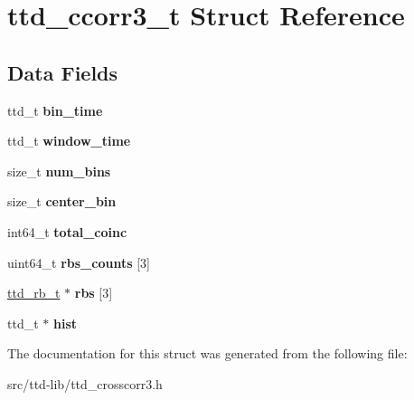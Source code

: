 \hypertarget{structttd__ccorr3__t}{}\section{ttd\+\_\+ccorr3\+\_\+t Struct Reference}
\label{structttd__ccorr3__t}
\subsection*{Data Fields}
\begin{DoxyCompactItemize}
\item 
\hypertarget{structttd__ccorr3__t_a1b78bd602c9780771a731ff59b39e214}{}ttd\+\_\+t {\bfseries bin\+\_\+time}\label{structttd__ccorr3__t_a1b78bd602c9780771a731ff59b39e214}

\item 
\hypertarget{structttd__ccorr3__t_ab3fdd8df8049f1fab663a27a9b4acfbb}{}ttd\+\_\+t {\bfseries window\+\_\+time}\label{structttd__ccorr3__t_ab3fdd8df8049f1fab663a27a9b4acfbb}

\item 
\hypertarget{structttd__ccorr3__t_a1fe4cf804dcccb4879c1834cbfd13d9c}{}size\+\_\+t {\bfseries num\+\_\+bins}\label{structttd__ccorr3__t_a1fe4cf804dcccb4879c1834cbfd13d9c}

\item 
\hypertarget{structttd__ccorr3__t_a932f1073e41399d43d4910d67677276d}{}size\+\_\+t {\bfseries center\+\_\+bin}\label{structttd__ccorr3__t_a932f1073e41399d43d4910d67677276d}

\item 
\hypertarget{structttd__ccorr3__t_a7808ee4e7455c7b5aad4f2c277cd69e3}{}int64\+\_\+t {\bfseries total\+\_\+coinc}\label{structttd__ccorr3__t_a7808ee4e7455c7b5aad4f2c277cd69e3}

\item 
\hypertarget{structttd__ccorr3__t_ae10696d3049f51f2e8bf4b6af043489e}{}uint64\+\_\+t {\bfseries rbs\+\_\+counts} \mbox{[}3\mbox{]}\label{structttd__ccorr3__t_ae10696d3049f51f2e8bf4b6af043489e}

\item 
\hypertarget{structttd__ccorr3__t_a5695c7e4aae5c5b724f2681d72c20720}{}\hyperlink{structttd__rb__t}{ttd\+\_\+rb\+\_\+t} $\ast$ {\bfseries rbs} \mbox{[}3\mbox{]}\label{structttd__ccorr3__t_a5695c7e4aae5c5b724f2681d72c20720}

\item 
\hypertarget{structttd__ccorr3__t_adb2b08f8c04f4a8ea4243ddda96c1bcf}{}ttd\+\_\+t $\ast$ {\bfseries hist}\label{structttd__ccorr3__t_adb2b08f8c04f4a8ea4243ddda96c1bcf}

\end{DoxyCompactItemize}


The documentation for this struct was generated from the following file\+:\begin{DoxyCompactItemize}
\item 
src/ttd-\/lib/ttd\+\_\+crosscorr3.\+h\end{DoxyCompactItemize}
